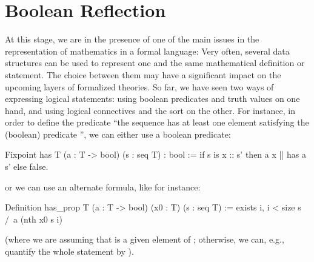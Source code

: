 \chapter{Boolean Reflection}{}
\label{ch:boolrefl}





At this stage, we are in the presence of one of the main issues in the
representation of mathematics in a formal language: Very often,
several data structures can be used to represent one and the same
mathematical definition or statement. The choice between them
may have a significant impact
on the upcoming layers of formalized theories. So far, we have seen two
ways of expressing logical statements: using boolean predicates and
truth values on one hand, and using logical connectives and the
 sort on the other. For instance, in order to define the
predicate ``the sequence  has at least one element satisfying the
(boolean) predicate '', we can either use a boolean predicate:

\begin{coq}{}{}
Fixpoint has T (a : T -> bool) (s : seq T) : bool :=
  if s is x :: s' then a x || has a s' else false.
\end{coq}

or we can use an alternate formula, like for instance:

\begin{coq}{}{}
Definition has_prop  T (a : T -> bool) (x0 : T) (s : seq T) :=
   exists i, i < size s /\ a (nth x0 s i)
\end{coq}

(where we are assuming that  is a given element of ;
otherwise, we can, e.g., quantify the whole statement by
).


